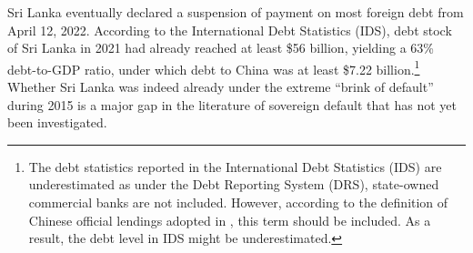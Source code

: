 Sri Lanka eventually declared a suspension of payment on most foreign debt from April 12, 2022. According to the International Debt Statistics (IDS), debt stock of Sri Lanka in 2021 had already reached at least \$56 billion, yielding a 63\% debt-to-GDP ratio, under which debt to China was at least \$7.22 billion.\footnote{
    The debt statistics reported in the International Debt Statistics (IDS) are underestimated as under the Debt Reporting System (DRS), state-owned commercial banks are not included. However, according to the definition of Chinese official lendings adopted in \citet*{Horn-Reinhart-Trebesch-21}, this term should be included. As a result, the debt level in IDS might be underestimated.
}
Whether Sri Lanka was indeed already under the extreme ``brink of default'' during 2015 is a major gap in the literature of sovereign default that has not yet been investigated.

